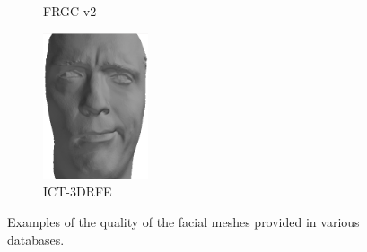 \begin{figure}[t]
\begin{subfigure}[b]{0.18\textwidth}
		\caption{FRGC v2}\label{fig:db_examples_frgc}
	\end{subfigure}
	\begin{subfigure}[b]{0.18\textwidth}
		\centering
		\includegraphics[height=1.7in]{background/images/ict}
		\caption{ICT-3DRFE}\label{fig:db_examples_ict}
	\end{subfigure}
	\caption{Examples of the quality of the facial meshes provided in various
	         databases.}
\label{fig:db_examples}
\end{figure}
